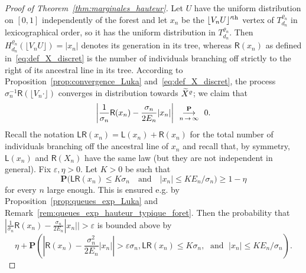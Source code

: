 \documentclass[AHL,Unicode,longabstracts,published]{cedram}
\newcommand{\ensembles}[1]{\mathbf{#1}}
\renewcommand{\P}{\ensembles{P}}
\renewcommand{\Pr}[1]{\P\left(#1\right)}
\newcommand{\1}{\ensembles{1}}
\newcommand{\tildep}[1]{\widetilde{#1}\vphantom{#1}}
\renewcommand{\le}{\leqslant}
\renewcommand{\ge}{\geqslant}
\newcommand{\LL}{\mathsf{L}}
\newcommand{\RR}{\mathsf{R}}
\newcommand{\LR}{\mathsf{LR}}
\newcommand{\fn}{T_{d_n}^{\varrho_n}}
\newcommand{\Hfn}{H_{d_n}^{\varrho_n}}
\newcommand{\tX}{\tildep{X}^{\varrho}}
\newcommand{\edges}{E}
\newcommand{\vertices}{V}
\newcommand{\cvproba}[1][n]{\enskip\mathop{\longrightarrow}^{\P}_{#1\,\to\, \infty}\enskip}
\begin{document}
\begin{proof}[Proof of Theorem~\ref{thm:marginales_hauteur}]
Let $U$ have the uniform distribution on $[0,1]$ independently of the forest and let $x_n$ be the $\lfloor \vertices_n U\rfloor'^{\rm th}$ vertex of $\fn$ in lexicographical order, so it has the uniform distribution in $\fn$. Then $\Hfn(\lfloor \vertices_n U\rfloor) = |x_n|$ denotes its generation in its tree, whereas $\RR(x_n)$ as defined in~\eqref{eq:def_X_discret} is the number of individuals branching off strictly to the right of its ancestral line in its tree. According to Proposition~\ref{prop:convergence_Luka} and~\eqref{eq:def_X_discret}, the process $\sigma_n^{-1} \RR(\lfloor \vertices_n \cdot\rfloor)$ converges in distribution towards $\tX$; we claim that
\begin{equation}\label{eq:ecart_longueur_LR}
\left|\frac{1}{\sigma_n} \RR(x_n) - \frac{\sigma_n}{2 \edges_n} |x_n| \right| \cvproba 0.
\end{equation}
Recall the notation $\LR(x_n) = \LL(x_n) + \RR(x_n)$ for the total number of individuals branching off the ancestral line of $x_n$ and recall that, by symmetry, $\LL(x_n)$ and $\RR(X_n)$ have the same law (but they are not independent in general). Fix $\varepsilon, \eta > 0$. Let $K > 0$ be such that
\[
\P\big(\LR(x_n) \le K \sigma_n\quad \text{and}\quad |x_n| \le K \edges_n / \sigma_n\big) \ge 1-\eta
\]
for every $n$ large enough. This is ensured e.g. by Proposition~\ref{prop:queues_exp_Luka} and Remark~\ref{rem:queues_exp_hauteur_typique_foret}. Then the probability that $|\frac{1}{\sigma_n}\RR(x_n) - \frac{\sigma_n}{2 \edges_n}|x_n|| > \varepsilon$ is bounded above by
\[
\eta + \Pr{\left|\RR\left(x_n\right) - \frac{\sigma_n^2}{2 \edges_n}|x_n|\right| > \varepsilon \sigma_n,
\LR(x_n) \le K \sigma_n,
\;\text{ and }\; |x_n| \le K \edges_n / \sigma_n}.
\]



\end{proof}
\end{document}
